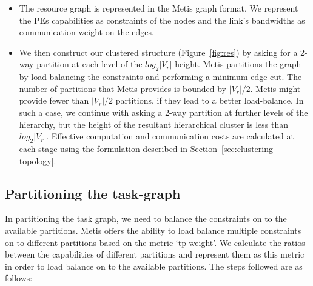 \begin{itemize}


\item The resource graph is represented in the Metis graph format. We
  represent the PEs capabilities as constraints of the nodes and the
  link's bandwidths as communication weight on the edges.

\item We then construct our clustered structure (Figure~\ref{fig:res})
  by asking for a 2-way partition at each level of the $log_2|V_r|$
  height. Metis partitions the graph by load balancing the constraints
  and performing a minimum edge cut. The number of partitions that Metis
  provides is bounded by $|V_r|/2$. Metis might provide fewer than
  $|V_r|/2$ partitions, if they lead to a better load-balance. In such a
  case, we continue with asking a 2-way partition at further levels of
  the hierarchy, but the height of the resultant hierarchical cluster is
  less than $log_2|V_r|$. Effective computation and communication costs
  are calculated at each stage using the formulation described in
  Section~\ref{sec:clustering-topology}.

\end{itemize}

\subsection{Partitioning the task-graph}
\label{sec:part-task-graph}

In partitioning the task graph, we need to balance the constraints on to
the available partitions. Metis offers the ability to load balance
multiple constraints on to different partitions based on the metric
\mbox{`tp-weight'}. We calculate the ratios between the capabilities of
different partitions and represent them as this metric in order to load
balance on to the available partitions. The steps followed are as
follows:


